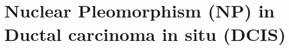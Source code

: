 \documentclass[usenames,dvipsnames]{beamer}
\begin{document}
%
%


\section{Nuclear Pleomorphism (NP) in Ductal carcinoma in situ (DCIS)}
\end{document}
